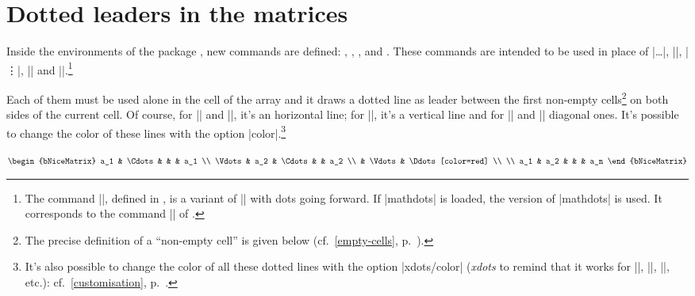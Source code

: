 \documentclass[dvipsnames]{article}
\begin{document}
\section{Dotted leaders in the matrices}

\label{Cdots}

Inside the environments of the package , new commands are
defined: , ,
,  and
. These commands are intended to be used in place of
|\dots|, |\cdots|, |\vdots|, |\ddots| and |\iddots|.\footnote{The command |\iddots|, defined in , is a
variant of |\ddots| with dots going forward. If |mathdots| is loaded, the
version of |mathdots| is used. It corresponds to the command |\adots| of
.} 
\setcounter{fniddots}{\thefootnote}

\smallskip
Each of them must be used alone in the cell of the array and it draws a dotted
line as leader between the first non-empty cells\footnote{The precise definition of a
``non-empty cell'' is given below (cf.~\ref{empty-cells}, p.~\pageref{empty-cells}).} on both
sides of the current cell. Of course, for |\Ldots| and |\Cdots|, it's an
horizontal line; for |\Vdots|, it's a vertical line and for |\Ddots| and
|\Iddots| diagonal ones. It's possible to change the color of these lines
with the option |color|.\footnote{It's also possible to change the color of
all these dotted lines with the option |xdots/color| (\textsl{xdots} to
remind that it works for |\Cdots|, |\Ldots|, |\Vdots|, etc.):
cf.~\ref{customisation}, p.~\pageref{customisation}.}

\nobreak
\bigskip
\begin{Code}[width=10cm,show-output]
$\begin{bNiceMatrix}
a_1      & \Cdots &        & & a_1    \\
\Vdots   & a_2    & \Cdots & & a_2    \\
         & \Vdots & \Ddots[color=red] \\
\\
a_1      & a_2    &        & & a_n 
\end{bNiceMatrix}$
\end{Code}
\end{document}
